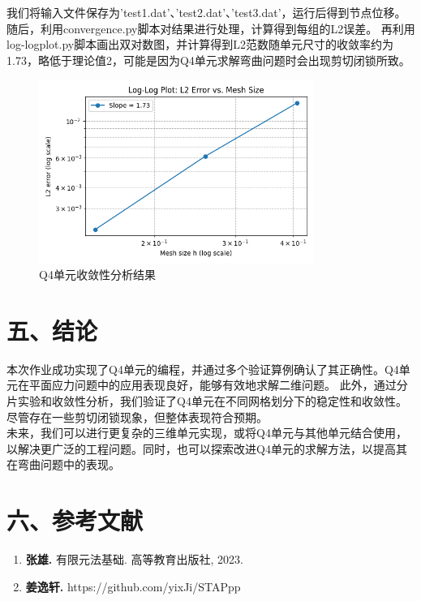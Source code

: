 \documentclass[12pt]{article}
\begin{document}
我们将输入文件保存为'test1.dat'、'test2.dat'、'test3.dat'，运行后得到节点位移。随后，利用convergence.py脚本对结果进行处理，计算得到每组的L2误差。
再利用log-logplot.py脚本画出双对数图，并计算得到L2范数随单元尺寸的收敛率约为1.73，略低于理论值2，可能是因为Q4单元求解弯曲问题时会出现剪切闭锁所致。\\
\begin{figure}[htbp]
    \centering
    \includegraphics[width=0.8\textwidth]{data/log-log.png}
    \caption{Q4单元收敛性分析结果}
\end{figure}
\section*{五、结论}
本次作业成功实现了Q4单元的编程，并通过多个验证算例确认了其正确性。Q4单元在平面应力问题中的应用表现良好，能够有效地求解二维问题。
此外，通过分片实验和收敛性分析，我们验证了Q4单元在不同网格划分下的稳定性和收敛性。尽管存在一些剪切闭锁现象，但整体表现符合预期。\\
未来，我们可以进行更复杂的三维单元实现，或将Q4单元与其他单元结合使用，以解决更广泛的工程问题。同时，也可以探索改进Q4单元的求解方法，以提高其在弯曲问题中的表现。
\section*{六、参考文献}
\begin{enumerate}
    \item \textbf{张雄.} 有限元法基础. 高等教育出版社, 2023.
    \item \textbf{姜逸轩.} https://github.com/yixJi/STAPpp
\end{enumerate}
\end{document}
